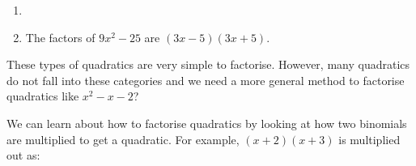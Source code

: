 {\begin{mdframed}[linewidth=4, leftmargin=40, rightmargin=40]
\begin{exercise}
\begin{enumerate}[noitemsep, label=\textbf{Step} \textbf{\arabic*}. ]
      \item  
      \label{m39394*id275517}\nopagebreak\noindent{}
      \item  
      \label{m39394*id275585}The factors of $9{x}^{2}-25$\hspace{1ex} are $\left(3x-5\right)\left(3x+5\right)$. \par 
      \end{enumerate}
    \end{exercise}
    \end{mdframed}
    }
    \noindent
      \label{m39394*id275654}These types of quadratics are very simple to factorise. However, many quadratics do not fall into these categories and we need a more general method to factorise quadratics like ${x}^{2}-x-2$\hspace{1ex}?\par 
      \label{m39394*id275684}We can learn about how to factorise quadratics by looking at how two binomials are multiplied to get a quadratic. For example, $\left(x+2\right)\left(x+3\right)$ is multiplied out as:\par 
      \label{m39394*id275716}\nopagebreak\noindent{}
